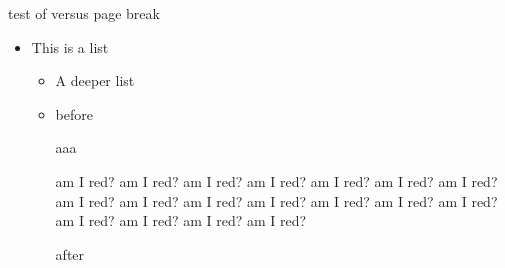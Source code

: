 \documentclass[a4paper]{article}
\begin{document}
\noindent\hrulefill test of \string\color\space versus page break\hrulefill

\vspace{17cm}

\begin{itemize}
\item This is a list

  \begin{itemize}
  \item A deeper list

  \item
    before

    \begin{snugshade}

      aaa

      \color{red}

      am I red?  am I red?  am I red?  am I red?  am I red?  am I red?  am I
      red?  am I red?  am I red?  am I red?  am I red?  am I red?  am I red?
      am I red?  am I red?  am I red?  am I red?  am I red?
    \end{snugshade}

    after
  \end{itemize}
\end{itemize}
\end{document}
